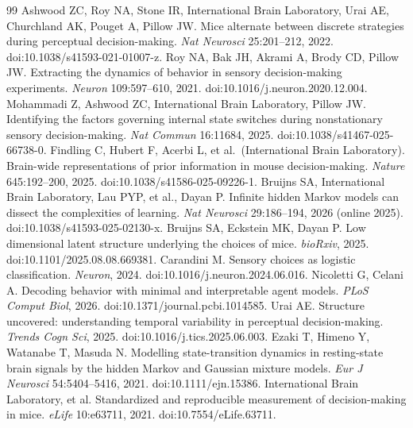 \documentclass[11pt]{article}
\begin{document}
\begin{thebibliography}{99}
 Ashwood ZC, Roy NA, Stone IR, International Brain Laboratory, Urai AE, Churchland AK, Pouget A, Pillow JW. Mice alternate between discrete strategies during perceptual decision-making. \emph{Nat Neurosci} 25:201--212, 2022. doi:10.1038/s41593-021-01007-z.
 Roy NA, Bak JH, Akrami A, Brody CD, Pillow JW. Extracting the dynamics of behavior in sensory decision-making experiments. \emph{Neuron} 109:597--610, 2021. doi:10.1016/j.neuron.2020.12.004.
 Mohammadi Z, Ashwood ZC, International Brain Laboratory, Pillow JW. Identifying the factors governing internal state switches during nonstationary sensory decision-making. \emph{Nat Commun} 16:11684, 2025. doi:10.1038/s41467-025-66738-0.
 Findling C, Hubert F, Acerbi L, et al.\ (International Brain Laboratory). Brain-wide representations of prior information in mouse decision-making. \emph{Nature} 645:192--200, 2025. doi:10.1038/s41586-025-09226-1.
 Bruijns SA, International Brain Laboratory, Lau PYP, et al., Dayan P. Infinite hidden Markov models can dissect the complexities of learning. \emph{Nat Neurosci} 29:186--194, 2026 (online 2025). doi:10.1038/s41593-025-02130-x.
 Bruijns SA, Eckstein MK, Dayan P. Low dimensional latent structure underlying the choices of mice. \emph{bioRxiv}, 2025. doi:10.1101/2025.08.08.669381.
 Carandini M. Sensory choices as logistic classification. \emph{Neuron}, 2024. doi:10.1016/j.neuron.2024.06.016.
 Nicoletti G, Celani A. Decoding behavior with minimal and interpretable agent models. \emph{PLoS Comput Biol}, 2026. doi:10.1371/journal.pcbi.1014585.
 Urai AE. Structure uncovered: understanding temporal variability in perceptual decision-making. \emph{Trends Cogn Sci}, 2025. doi:10.1016/j.tics.2025.06.003.
 Ezaki T, Himeno Y, Watanabe T, Masuda N. Modelling state-transition dynamics in resting-state brain signals by the hidden Markov and Gaussian mixture models. \emph{Eur J Neurosci} 54:5404--5416, 2021. doi:10.1111/ejn.15386.
 International Brain Laboratory, et al. Standardized and reproducible measurement of decision-making in mice. \emph{eLife} 10:e63711, 2021. doi:10.7554/eLife.63711.
\end{thebibliography}
\end{document}
